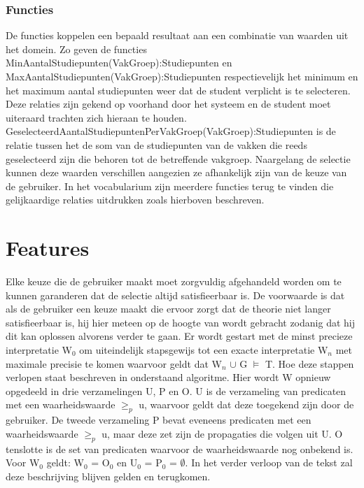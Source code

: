 \subsubsection{Functies}
De functies koppelen een bepaald resultaat aan een combinatie van waarden uit het domein. Zo geven de functies MinAantalStudiepunten(VakGroep):Studiepunten en MaxAantalStudiepunten(VakGroep):Studiepunten respectievelijk het minimum en het maximum aantal studiepunten weer dat de student verplicht is te selecteren. Deze relaties zijn gekend op voorhand door het systeem en de student moet uiteraard trachten zich hieraan te houden. GeselecteerdAantalStudiepuntenPerVakGroep(VakGroep):Studiepunten is de relatie tussen het de som van de studiepunten van de vakken die reeds geselecteerd zijn die behoren tot de betreffende vakgroep. Naargelang de selectie kunnen deze waarden verschillen aangezien ze afhankelijk zijn van de keuze van de gebruiker. In het vocabularium zijn meerdere functies terug te vinden die gelijkaardige relaties uitdrukken zoals hierboven beschreven. 


\section{Features}

Elke keuze die de gebruiker maakt moet zorgvuldig afgehandeld worden om te kunnen garanderen dat de selectie altijd satisfieerbaar is. De voorwaarde is dat als de gebruiker een keuze maakt die ervoor zorgt dat de theorie niet langer satisfieerbaar is, hij hier meteen op de hoogte van wordt gebracht zodanig dat hij dit kan oplossen alvorens verder te gaan. Er wordt gestart met de minst precieze interpretatie W$_{0}$ om uiteindelijk stapsgewijs tot een exacte interpretatie W$_{n}$ met maximale precisie te komen waarvoor geldt dat W$_{n}$ $\cup$ G $\models$ T. Hoe deze stappen verlopen staat beschreven in onderstaand algoritme. Hier wordt W opnieuw opgedeeld in drie verzamelingen U, P en O. U is de verzameling van predicaten met een waarheidswaarde $\geq_{p}$ u, waarvoor geldt dat deze toegekend zijn door de gebruiker. De tweede verzameling P bevat eveneens predicaten met een waarheidswaarde $\geq_{p}$ u, maar deze zet zijn de propagaties die volgen uit U. O tenslotte is de set van predicaten waarvoor de waarheidswaarde nog onbekend is. Voor W$_{0}$ geldt: W$_{0}$ = O$_{0}$ en U$_{0}$ = P$_{0}$ = $\emptyset$. In het verder verloop van de tekst zal deze beschrijving blijven gelden en terugkomen.

